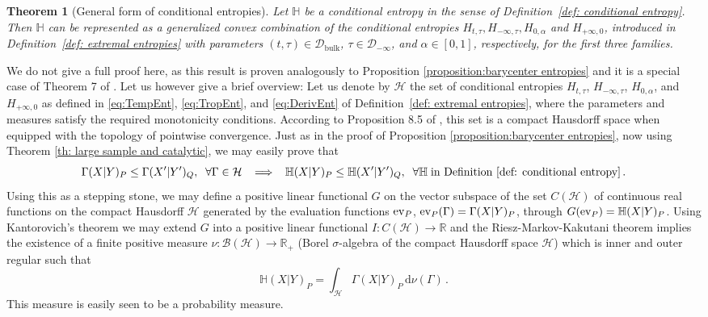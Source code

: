 \documentclass[aps,pra,11pt,onecolumn,nofootinbib,tightenlines]{revtex4-2}
\newtheorem{theorem}{Theorem}[section]
\theoremstyle{definition}
\renewcommand{\H}{\mathbb{H}}
\newcommand{\R}{\mathbb{R}}
\newcommand{\mc}[1]{\mathcal{#1}}
\newcommand{\mb}[1]{\mathbb{#1}}
\begin{document}
\begin{theorem}[General form of conditional entropies]
\label{th:barycenter conditional entropies}
Let $\H$ be a conditional entropy in the sense of Definition~\ref{def: conditional entropy}. 
Then $\H$ can be represented as a generalized convex combination of the conditional entropies
$H_{t,\tau}, H_{-\infty,\tau}, H_{0,\alpha}$ and $H_{+\infty,0}$,
introduced in Definition~\ref{def: extremal entropies} with parameters $(t,\tau)\in\mathcal{D}_{\mathrm{bulk}}$, $\tau\in\mathcal{D}_{-\infty}$, and $\alpha\in[0,1]$, respectively, for the first three families. 
\end{theorem}
We do not give a full proof here, as this result is proven analogously to Proposition \ref{proposition:barycenter entropies} and it is a special case of Theorem 7 of \cite{haapasalo_inprep}. Let us however give a brief overview: Let us denote by $\mc H$ the set of conditional entropies $H_{t,\tau}$, $H_{-\infty,\tau}$, $H_{0,\alpha}$, and $H_{+\infty,0}$ as defined in \eqref{eq:TempEnt}, \eqref{eq:TropEnt}, and \eqref{eq:DerivEnt} of Definition~\ref{def: extremal entropies}, where the parameters and measures satisfy the required monotonicity conditions. According to Proposition 8.5 of \cite{fritz2023abstractII}, this set is a compact Hausdorff space when equipped with the topology of pointwise convergence. Just as in the proof of Proposition \ref{proposition:barycenter entropies}, now using Theorem \ref{th: large sample and catalytic}, we may easily prove that
\begin{equation}
\Gamma(X|Y)_P \leq \Gamma(X'|Y')_Q,
\;\; \forall \Gamma \in \mc H \;\; \implies \;\; \H(X|Y)_P \leq \H(X'|Y')_Q, \;\; \forall \H \;\text{in Definition~\ref{def: conditional entropy}} \,.
\end{equation}
Using this as a stepping stone, we may define a positive linear functional $G$ on the vector subspace of the set $C(\mc H)$ of continuous real functions on the compact Hausdorff $\mc H$ generated by the evaluation functions ${\rm ev}_{P}$, ${\rm ev}_P(\Gamma)=\Gamma(X|Y)_P$, through $G({\rm ev}_P)=\mb H(X|Y)_P$. Using Kantorovich's theorem we may extend $G$ into a positive linear functional $I:C(\mc H)\to\R$ and the Riesz-Markov-Kakutani theorem implies the existence of a finite positive measure $\nu:\mc B(\mc H)\to\R_+$ (Borel $\sigma$-algebra of the compact Hausdorff space $\mc H$) which is inner and outer regular such that
\begin{equation}
\mb H(X|Y)_P=\int_{\mc H}\Gamma(X|Y)_P\,\mathrm{d}\nu(\Gamma)\,.
\end{equation}
This measure is easily seen to be a probability measure.
\end{document}
